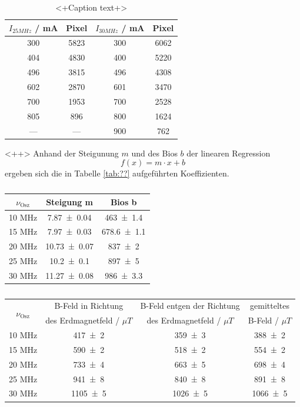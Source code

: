 \begin{table}
  \centering
  \caption{<+Caption text+>}
  \begin{tabular}{c c|c c}
    \toprule
 	$I_{25MHz}$ / mA & Pixel & $I_{30MHz}$ / mA & Pixel \\
    \midrule
	300 & 5823 & 300 & 6062 \\
	404 & 4830 & 400 & 5220 \\
	496 & 3815 & 496 & 4308 \\
	602 & 2870 & 601 & 3470 \\
	700 & 1953 & 700 & 2528 \\
	805 & 896  & 800 & 1624 \\
	--- & ---  & 900 & 762  \\
    \bottomrule
  \end{tabular}
  \label{tab:<+label+>}
\end{table}<++>
Anhand der Steigunung $m$ und des Bios $b$ der linearen Regression
\begin{equation}
  f(x) = m \cdot x + b
  \label{eqn:Reg}
\end{equation}
ergeben sich die in Tabelle \ref{tab:??} aufgeführten Koeffizienten. 
\begin{table}
  \centering
  \caption{}
  \begin{tabular}{c|c c}
    \toprule
    	$\nu_\text{Osz}$ & Steigung m & Bios b \\
    \midrule
       	10 MHz & \num{7.87 +- 0.04}  & \num{463 +- 1.4} \\
	15 MHz & \num{7.97 +- 0.03}  & \num{678.6 +- 1.1} \\ 
	20 MHz & \num{10.73 +- 0.07} & \num{837 +- 2} \\
	25 MHz & \num{10.2 +- 0.1}   & \num{897 +- 5} \\
	30 MHz & \num{11.27 +- 0.08} & \num{986 +- 3.3}\\
    \bottomrule
  \end{tabular}
  \label{tab:}
\end{table}

\begin{table}
  \centering
  \caption{}
  \begin{tabular}{c|c c c}
    \toprule
    \multirow{2}{*}{$\nu_\text{Osz}$} & B-Feld in Richtung & B-Feld entgen der Richtung & gemitteltes \\
    	& des Erdmagnetfeld / $\mu T$ & des Erdmagnetfeld / $\mu T$ & B-Feld / $\mu T$ \\
    \midrule
       	10 MHz & \num{417 +- 2} & \num{359 +- 3} & \num{388 +- 2} \\
	15 MHz & \num{590 +- 2} & \num{518 +- 2} & \num{554 +- 2} \\ 
	20 MHz & \num{733 +- 4} & \num{663 +- 5} & \num{698 +- 4} \\
	25 MHz & \num{941 +- 8} & \num{840 +- 8} & \num{891 +- 8} \\
	30 MHz & \num{1105 +- 5} & \num{1026 +- 5} & \num{1066 +- 5} \\
    \bottomrule
  \end{tabular}
  \label{tab:}
\end{table}

